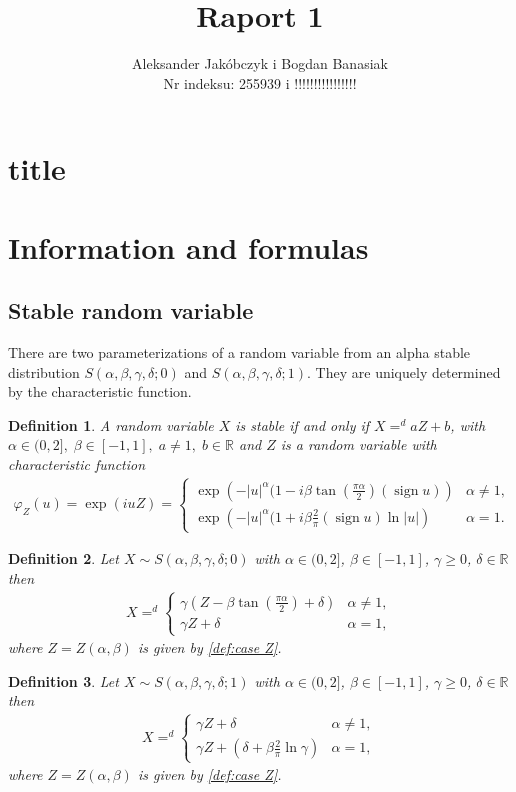 \documentclass{article}
\title{Raport 1}
\author{Aleksander Jakóbczyk i Bogdan Banasiak\\ 
	Nr indeksu: 255939 i !!!!!!!!!!!!!!!!}
\date{}\date{}
\newtheorem{definition}{Definition}
\DeclareMathOperator{\sign}{sign}
\begin{document}
	
	\maketitle
	\section*{title}
	\section{Information and formulas}
		\subsection*{Stable random variable}
		There are two parameterizations of a random variable from an alpha stable distribution $S(\alpha, \beta , \gamma, \delta; 0)$ and $S(\alpha, \beta , \gamma, \delta; 1)$.
		They are uniquely determined by the characteristic function.
		\begin{definition} A random variable $X$ is stable if and only if $X=^d aZ +b$, with \\$\alpha \in (0,2],\;\beta\in [-1,1],\; a\ne1,\; b\in\mathbb{R}$ and $Z$ is a random variable with characteristic function  
			\begin{gather}
				\varphi_Z(u) = \exp(i u Z) =
				\begin{cases}\label{def:case Z}
					\exp\left(- |u|^\alpha(1-i\beta\tan(\frac{\pi\alpha}{2})(\sign u)  \right) &\alpha \ne 1,\\
					\exp\left(- |u|^\alpha(1+i\beta\frac{2}{\pi}(\sign u)\ln|u|  \right) &\alpha = 1.
				\end{cases}
			\end{gather}
		\end{definition}
		\begin{definition} Let $X \sim S(\alpha, \beta , \gamma, \delta; 0)$ with $\alpha \in (0,2]$, $\beta \in [-1,1]$, $\gamma \ge 0$, $\delta\in\mathbb{R}$ then  
			\begin{gather*}
				X =^d 
				\begin{cases}
					\gamma (Z- \beta\tan(\frac{\pi\alpha}{2})+\delta)& \alpha\ne1,\\
					\gamma Z + \delta& \alpha=1,
				\end{cases}
			\end{gather*}
			where $Z = Z(\alpha,\beta)$ is given by \ref{def:case Z}.
		\end{definition}

		\begin{definition} Let $X \sim S(\alpha, \beta , \gamma, \delta; 1)$ with $\alpha \in (0,2]$, $\beta \in [-1,1]$, $\gamma \ge 0$, $\delta\in\mathbb{R}$ then  
			\begin{gather*}
				X =^d 
				\begin{cases}
					\gamma Z + \delta & \alpha \ne 1,\\
					\gamma Z + (\delta + \beta\frac{2}{\pi}\ln\gamma)& \alpha = 1,
				\end{cases}
			\end{gather*}
			where $Z = Z(\alpha,\beta)$ is given by \ref{def:case Z}.
		\end{definition}
\end{document}
